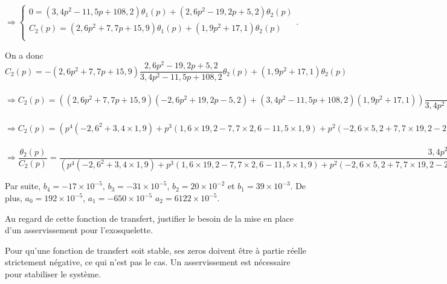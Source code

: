 \documentclass[11pt]{article}
\begin{document}
\begin{UPSTIcorrige}
$\Rightarrow \left\{
\begin{array}{l} 
0= \left(3,4 p^2 - 11,5 p + 108,2\right) \theta_1(p) + \left(2,6p^2 - 19,2p + 5,2\right)\theta_2(p) \\
C_2(p) = \left( 2,6 p^2 + 7,7 p + 15,9\right)\theta_1(p) + \left( 1,9 p^2+ 17,1\right)\theta_2(p) \\
\end{array}
\right.$.

On a donc 
$C_2(p) = - \left( 2,6 p^2 + 7,7 p + 15,9\right)\dfrac{2,6p^2 - 19,2p + 5,2}{3,4 p^2 - 11,5 p + 108,2}\theta_2(p) + \left( 1,9 p^2+ 17,1\right)\theta_2(p) $

$\Rightarrow C_2(p) = \left( \left( 2,6 p^2 + 7,7 p + 15,9\right)\left(-2,6p^2 + 19,2p - 5,2\right) + \left(3,4 p^2 - 11,5 p + 108,2\right) \left( 1,9 p^2+ 17,1\right)\right)\dfrac{\theta_2(p)}{3,4 p^2 - 11,5 p + 108,2} $

$\Rightarrow C_2(p) = 
\left(p^4 \left( - 2,6 ^2 +3,4 \times 1,9 \right)
+p^3 \left( 1,6 \times 19,2 - 7,7 \times 2,6  -11,5 \times 1,9\right) 
+p^2 \left( -2,6 \times 5,2 +7,7 \times 19,2 - 2,6 \times 15,9 +3,4 \times 17,1 +108,2 \times 1,9 \right) 
+p \left( -7,7 \times 5,2 + 15,9 \times 19,2 -11,5 \times 17,1\right)
- 15,9 \times 5,2 +108,2 \times 17,1\right)\dfrac{\theta_2(p)}{3,4 p^2 - 11,5 p + 108,2} $


$\Rightarrow \dfrac{\theta_2(p)}{C_2(p)} =\dfrac{3,4 p^2 - 11,5 p + 108,2} {\left(p^4 \left( - 2,6 ^2 +3,4 \times 1,9 \right)
+p^3 \left( 1,6 \times 19,2 - 7,7 \times 2,6  -11,5 \times 1,9\right) 
+p^2 \left( -2,6 \times 5,2 +7,7 \times 19,2 - 2,6 \times 15,9 +3,4 \times 17,1 +108,2 \times 1,9 \right) 
+p \left( -7,7 \times 5,2 + 15,9 \times 19,2 -11,5 \times 17,1\right)
- 15,9 \times 5,2 +108,2 \times 17,1\right)}$


Par suite, $b_4 = -17 \times 10^{-5}$, $b_3 = -31 \times 10^{-5}$, $b_2=20 \times 10^{-2} $ et $b_1 = 39 \times 10^{-3}$.
De plus, $a_0 = 192\times 10^{-5}$, $a_1=-650\times 10^{-5}$ $a_2 =  6122\times 10^{-5}$.

\end{UPSTIcorrige}


\UPSTIquestion Au regard de cette fonction de transfert, justifier le besoin de la mise en place d'un asservissement pour l'exosquelette.

\begin{UPSTIcorrige}
Pour qu'une fonction de transfert soit stable, ses zeros doivent être à partie réelle strictement négative, ce qui n'est pas le cas. Un asservissement est nécessaire pour stabiliser le système.
\end{UPSTIcorrige}
\end{document}
